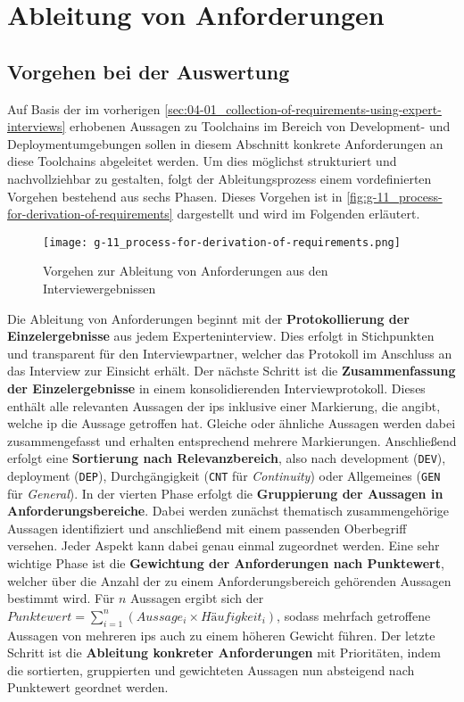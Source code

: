 \section{Ableitung von Anforderungen}
\label{sec:04-02_derivation-of-requirements}

\subsection{Vorgehen bei der Auswertung}
\label{subsec:04-02-01_procedure-for-evaluation}

Auf Basis der im vorherigen \autoref{sec:04-01_collection-of-requirements-using-expert-interviews} erhobenen Aussagen zu Toolchains im Bereich von Development- und Deploymentumgebungen sollen in diesem Abschnitt konkrete Anforderungen an diese Toolchains abgeleitet werden. Um dies möglichst strukturiert und nachvollziehbar zu gestalten, folgt der Ableitungsprozess einem vordefinierten Vorgehen bestehend aus sechs Phasen. Dieses Vorgehen ist in \autoref{fig:g-11_process-for-derivation-of-requirements} dargestellt und wird im Folgenden erläutert.

\begin{figure}[h]
    \centering
    \texttt{[image: g-11\_process-for-derivation-of-requirements.png]}
    \caption{Vorgehen zur Ableitung von Anforderungen aus den Interviewergebnissen}
    \label{fig:g-11_process-for-derivation-of-requirements}
\end{figure}

Die Ableitung von Anforderungen beginnt mit der \textbf{Protokollierung der Einzelergebnisse} aus jedem Experteninterview. Dies erfolgt in Stichpunkten und transparent für den Interviewpartner, welcher das Protokoll im Anschluss an das Interview zur Einsicht erhält. Der nächste Schritt ist die \textbf{Zusammenfassung der Einzelergebnisse} in einem konsolidierenden Interviewprotokoll. Dieses enthält alle relevanten Aussagen der \Glspl{ip} inklusive einer Markierung, die angibt, welche \Gls{ip} die Aussage getroffen hat. Gleiche oder ähnliche Aussagen werden dabei zusammengefasst und erhalten entsprechend mehrere Markierungen. Anschließend erfolgt eine \textbf{Sortierung nach Relevanzbereich}, also nach \Gls{development} (\texttt{DEV}), \Gls{deployment} (\texttt{DEP}), Durchgängigkeit (\texttt{CNT} für \textit{Continuity}) oder Allgemeines (\texttt{GEN} für \textit{General}). In der vierten Phase erfolgt die \textbf{Gruppierung der Aussagen in Anforderungsbereiche}. Dabei werden zunächst thematisch zusammengehörige Aussagen identifiziert und anschließend mit einem passenden Oberbegriff versehen. Jeder Aspekt kann dabei genau einmal zugeordnet werden. Eine sehr wichtige Phase ist die \textbf{Gewichtung der Anforderungen nach Punktewert}, welcher über die Anzahl der zu einem Anforderungsbereich gehörenden Aussagen bestimmt wird. Für $ n $ Aussagen ergibt sich der $ Punktewert = \sum_{i=1}^{n} (Aussage_i \times Häufigkeit_i) $, sodass mehrfach getroffene Aussagen von mehreren \Glspl{ip} auch zu einem höheren Gewicht führen. Der letzte Schritt ist die \textbf{Ableitung konkreter Anforderungen} mit Prioritäten, indem die sortierten, gruppierten und gewichteten Aussagen nun absteigend nach Punktewert geordnet werden.

